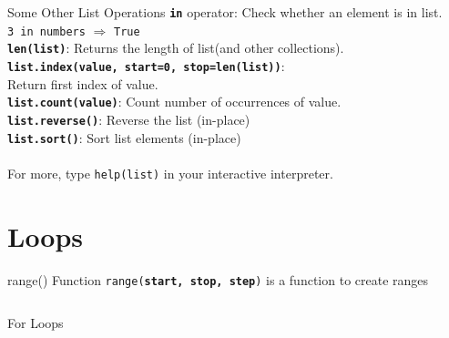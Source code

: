         \begin{frame}{Some Other List Operations}
            \Large
            \textbf{\texttt{in}} operator: Check whether an element is in list.\\
            \texttt{3 in numbers} $\Rightarrow$ \texttt{True}\\
            \textbf{\texttt{len(list)}}: Returns the length of list(and other collections).\\
            \textbf{\texttt{list.index(value, start=0, stop=len(list))}}:\\
            Return first index of value.\\
            \textbf{\texttt{list.count(value)}}: Count number of occurrences of value.\\
            \textbf{\texttt{list.reverse()}}: Reverse the list (in-place)\\
            \textbf{\texttt{list.sort()}}: Sort list elements (in-place)\\
            \\ 
            For more, type \texttt{help(list)} in your interactive interpreter.
        \end{frame}


    \section{Loops}
      
        \begin{frame}{range() Function}
            \texttt{range(\textbf{start, stop, step})} is a function to create ranges
            \bigskip
            \inputminted[frame=single,framesep=2pt]{python3}{code-examples/range.py}
        \end{frame}
      
        \begin{frame}{For Loops}
            \begin{columns}
                \begin{column}{0.5\textwidth}
                    \inputminted[frame=single,framesep=2pt]{python3}{code-examples/for1.py}
                \end{column}
               \pause 
                \begin{column}{0.5\textwidth}
                    \inputminted[frame=single,framesep=2pt]{python3}{code-examples/for2.py}
                    \pause
                    \inputminted[frame=single,framesep=2pt]{python3}{code-examples/for3.py}
                    \pause
                    \inputminted[frame=single,framesep=2pt]{python3}{code-examples/for4.py}
                \end{column} 
            \end{columns}
        \end{frame}
        
